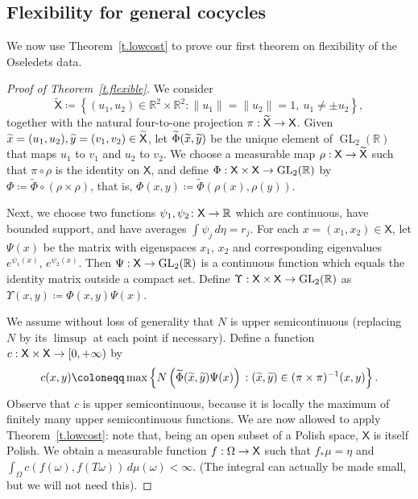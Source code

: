 \documentclass[10pt]{amsart}
\theoremstyle{definition}\newtheorem{defi}[theo]{Definition}\newtheorem{rema}[theo]{Remark}\newtheorem{exam}[theo]{Example}\newtheorem{exem}[theo]{Example}\newtheorem{nota}[theo]{Notation}
\newcommand{\R}{\mathbb{R}}
\newcommand{\sfX}{\mathsf{X}}
\newcommand{\st}{\;\mathord{:}\;}
\DeclareMathOperator{\GL}{GL}
\renewcommand*{\to}{\mathchoice{\longrightarrow}{\rightarrow}{\rightarrow}{\rightarrow}}
\let\oldtilde\tilde
\renewcommand*{\tilde}[1]{\mathchoice{\widetilde{#1}}{\widetilde{#1}}{\oldtilde{#1}}{\oldtilde{#1}}}
\begin{document}
\subsection{Flexibility for general cocycles}

We now use Theorem~\ref{t.lowcost} to prove our first theorem on flexibility of the Oseledets data.

\begin{proof}[Proof of Theorem~\ref{t.flexible}]
We consider
\begin{equation}
\widetilde{\sfX} \coloneqq \left\{ (u_1,u_2) \in \R^2\times \R^2: \|u_1\| = \|u_2\| = 1, \ u_1 \neq \pm u_2\right\},
\end{equation}
together with the natural four-to-one projection $\pi: \widetilde{\sfX} \to \sfX$. Given $\tilde{x} = (u_1,u_2),\tilde{y} = (v_1,v_2) \in \widetilde{\sfX}$, let $\widetilde{\Phi}(\tilde{x},\tilde{y})$ be the unique element of $\GL_2(\R)$ that maps $u_1$ to $v_1$ and $u_2$ to $v_2$. We choose a measurable map $\rho: \sfX \to \widetilde{\sfX}$ such that $\pi\circ \rho$ is the identity on $\sfX$, and define $\Phi:\sfX \times \sfX \to \GL_2(\R)$ by $\Phi\coloneqq \widetilde{\Phi} \circ (\rho\times \rho)$, that is, $\Phi(x,y) \coloneqq \widetilde{\Phi}(\rho(x),\rho(y))$.

Next, we choose two functions $\psi_1, \psi_2 \colon \sfX \to \R$ which are continuous, have bounded support, and have averages $\int \psi_j \, d\eta = r_j$. For each $x = (x_1,x_2) \in \sfX$, let $\Psi(x)$ be the matrix with eigenspaces $x_1$, $x_2$ and corresponding eigenvalues $e^{\psi_1(x)}$, $e^{\psi_2(x)}$. Then $\Psi:\sfX \to \GL_2(\R)$ is a continuous function which equals the identity matrix outside a compact set. Define $\Upsilon: \sfX \times \sfX \to \GL_2(\R)$ as $\Upsilon(x,y) \coloneqq \Phi(x,y)\Psi(x)$.

We assume without loss of generality that $N$ is upper semicontinuous (replacing~$N$ by its $\limsup$ at each point if necessary). Define a function $c:\sfX \times \sfX \to [0,+\infty)$ by
\begin{equation}\label{e.def_c}
c(x,y) \coloneqq
\max\left\{ N\left(\widetilde{\Phi}(\tilde{x},\tilde{y})\Psi(x)\right) \st (\tilde{x},\tilde{y}) \in (\pi\times \pi)^{-1}(x,y)\right\}.
\end{equation}
Observe that $c$ is upper semicontinuous, because it is locally the maximum of finitely many upper semicontinuous functions. We are now allowed to apply Theorem~\ref{t.lowcost}: note that, being an open subset of a Polish space, $\sfX$ is itself Polish. We obtain a measurable function $f:\Omega \to \sfX$ such that $f_*\mu = \eta$ and $\int_{\Omega}c(f(\omega),f(T\omega)) \, d\mu(\omega) < \infty $. (The integral can actually be made small, but we will not need this).


\end{proof}
\end{document}
